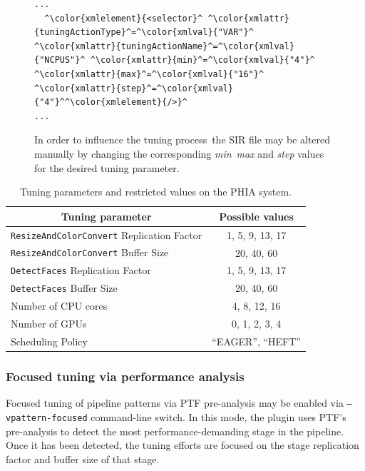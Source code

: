 \begin{figure}[htb]
\centering
\begin{lstlisting}
...
  ^\color{xmlelement}{<selector}^ ^\color{xmlattr}{tuningActionType}^=^\color{xmlval}{"VAR"}^ ^\color{xmlattr}{tuningActionName}^=^\color{xmlval}{"NCPUS"}^ ^\color{xmlattr}{min}^=^\color{xmlval}{"4"}^ ^\color{xmlattr}{max}^=^\color{xmlval}{"16"}^ ^\color{xmlattr}{step}^=^\color{xmlval}{"4"}^^\color{xmlelement}{/>}^
...
 \end{lstlisting}
 \caption{In order to influence the tuning process\, the SIR file may be altered manually by changing the corresponding \textit{min}\, \textit{max} and \textit{step} values for the desired tuning parameter.}
 \label{fig:sirtuningrange}
\end{figure}

\begin{table}[!h]
\begin{center}
\begin{tabular}{ @{} l @{} c }
\hline
\multicolumn{1}{c}{\textbf{ Tuning parameter }} & \textbf{ Possible values } \\
\hline
\hline
{ \texttt{ResizeAndColorConvert} Replication Factor}  & {1, 5, 9, 13, 17} \\ \hline 
{ \texttt{ResizeAndColorConvert} Buffer Size} & {20, 40, 60}  \\ \hline  
{ \texttt{DetectFaces} Replication Factor}  & {1, 5, 9, 13, 17} \\ \hline 
{ \texttt{DetectFaces} Buffer Size} & {20, 40, 60}  \\ \hline   
{ Number of CPU cores} & {4, 8, 12, 16} \\ \hline 
{ Number of GPUs} & {0, 1, 2, 3, 4} \\ \hline 
{ Scheduling Policy} & {``EAGER'', ``HEFT''}  \\ \hline 
\end{tabular}
\vspace{4pt}
\caption{Tuning parameters and restricted values on the PHIA system.}
\label{tab:fdspaceretricted}
\end{center}
\end{table}

\subsubsection{Focused tuning via performance analysis}
Focused tuning of pipeline patterns via PTF pre-analysis may be enabled via \texttt{--vpattern-focused} command-line switch. In this mode, the plugin uses PTF's pre-analysis to detect the most performance-demanding stage in the pipeline. Once it has been detected, the tuning efforts are focused on the stage replication factor and buffer size of that stage. 

